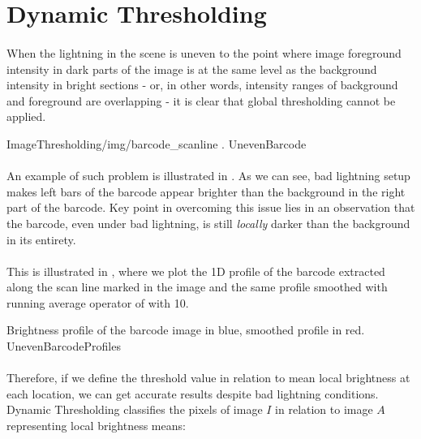 \section{Dynamic Thresholding}

\paragraph*{}
When the lightning in the scene is uneven to the point where image foreground intensity in dark parts of the image is at the same level as the background intensity in bright sections - or, in other words, intensity ranges of background and foreground are overlapping - it is clear that global thresholding cannot be applied.

\oneFigure
{ImageThresholding/img/barcode_scanline}
{.}
{UnevenBarcode}
{\basicWidth}

\paragraph*{}
An example of such problem is illustrated in . As we can see, bad lightning setup makes left bars of the barcode appear brighter than the background in the right part of the barcode. Key point in overcoming this issue lies in an observation that the barcode, even under bad lightning, is still \textit{locally} darker than the background in its entirety. 

\paragraph*{}
This is illustrated in , where we plot the 1D profile of the barcode extracted along the scan line marked in the image and the same profile smoothed with running average operator of with 10.

\profileFigure
{
}
{Brightness profile of the barcode image in blue, smoothed profile in red.}
{UnevenBarcodeProfiles}

\paragraph*{}
Therefore, if we define the threshold value in relation to mean local brightness at each location, we can get accurate results despite bad lightning conditions. Dynamic Thresholding classifies the pixels of image $I$ in relation to image $A$ representing local brightness means:

